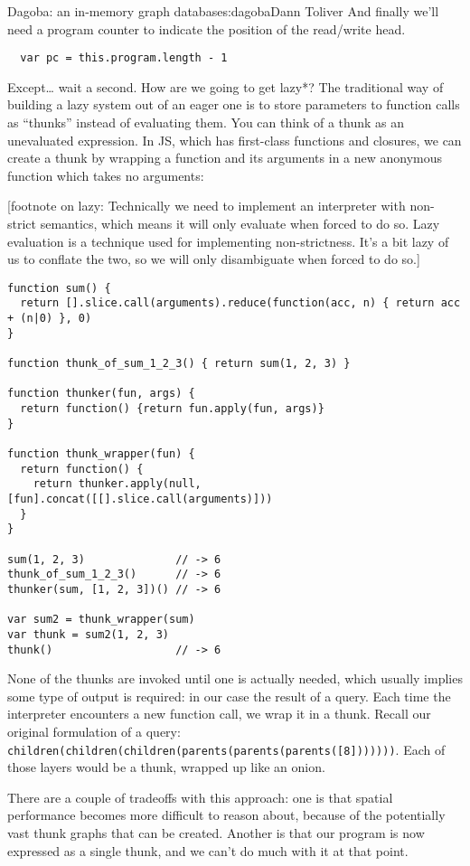 \begin{aosachapter}{Dagoba: an in-memory graph database}{s:dagoba}{Dann Toliver}
And finally we'll need a program counter to indicate the position of the
read/write head.

\begin{verbatim}
  var pc = this.program.length - 1
\end{verbatim}

Except\ldots{} wait a second. How are we going to get lazy*? The
traditional way of building a lazy system out of an eager one is to
store parameters to function calls as ``thunks'' instead of evaluating
them. You can think of a thunk as an unevaluated expression. In JS,
which has first-class functions and closures, we can create a thunk by
wrapping a function and its arguments in a new anonymous function which
takes no arguments:

{[}footnote on lazy: Technically we need to implement an interpreter
with non-strict semantics, which means it will only evaluate when forced
to do so. Lazy evaluation is a technique used for implementing
non-strictness. It's a bit lazy of us to conflate the two, so we will
only disambiguate when forced to do so.{]}

\begin{verbatim}
function sum() {
  return [].slice.call(arguments).reduce(function(acc, n) { return acc + (n|0) }, 0)
}

function thunk_of_sum_1_2_3() { return sum(1, 2, 3) }

function thunker(fun, args) {
  return function() {return fun.apply(fun, args)}
}

function thunk_wrapper(fun) {
  return function() {
    return thunker.apply(null, [fun].concat([[].slice.call(arguments)]))
  }
}

sum(1, 2, 3)              // -> 6
thunk_of_sum_1_2_3()      // -> 6
thunker(sum, [1, 2, 3])() // -> 6

var sum2 = thunk_wrapper(sum)
var thunk = sum2(1, 2, 3)
thunk()                   // -> 6
\end{verbatim}

None of the thunks are invoked until one is actually needed, which
usually implies some type of output is required: in our case the result
of a query. Each time the interpreter encounters a new function call, we
wrap it in a thunk. Recall our original formulation of a query:
\texttt{children(children(children(parents(parents(parents({[}8{]}))))))}.
Each of those layers would be a thunk, wrapped up like an onion.

There are a couple of tradeoffs with this approach: one is that spatial
performance becomes more difficult to reason about, because of the
potentially vast thunk graphs that can be created. Another is that our
program is now expressed as a single thunk, and we can't do much with it
at that point.


\end{aosachapter}
